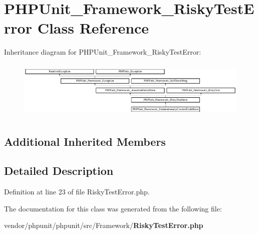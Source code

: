 \section{P\+H\+P\+Unit\+\_\+\+Framework\+\_\+\+Risky\+Test\+Error Class Reference}
\label{class_p_h_p_unit___framework___risky_test_error}
Inheritance diagram for P\+H\+P\+Unit\+\_\+\+Framework\+\_\+\+Risky\+Test\+Error\+:\begin{figure}[H]
\begin{center}
\leavevmode
\includegraphics[height=2.794411cm]{class_p_h_p_unit___framework___risky_test_error}
\end{center}
\end{figure}
\subsection*{Additional Inherited Members}


\subsection{Detailed Description}


Definition at line 23 of file Risky\+Test\+Error.\+php.



The documentation for this class was generated from the following file\+:\begin{DoxyCompactItemize}
\item 
vendor/phpunit/phpunit/src/\+Framework/{\bf Risky\+Test\+Error.\+php}\end{DoxyCompactItemize}
